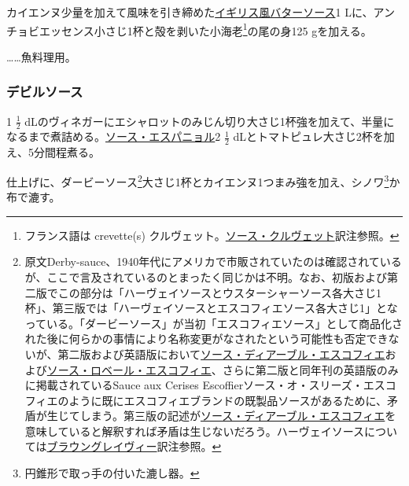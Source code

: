 \begin{recette}
カイエンヌ少量を加えて風味を引き締めた\protect\hyperlink{butter-sauce}{イギリス風バターソース}1
Lに、アンチョビエッセンス小さじ1杯と殻を剥いた小海老\footnote{フランス語は
  crevette(s)
  クルヴェット。\protect\hyperlink{sauce-aux-crevettes}{ソース・クルヴェット}訳注参照。}の尾の身125
gを加える。

\ldots{}\ldots{}魚料理用。

\hypertarget{devilled-sauce}{%
\subsubsection{デビルソース}\label{devilled-sauce}}



1 \(\frac{1}{2}\)
dLのヴィネガーにエシャロットのみじん切り大さじ1杯強を加えて、半量になるまで煮詰める。\protect\hyperlink{sauce-espagnole}{ソース・エスパニョル}2
\(\frac{1}{2}\) dLとトマトピュレ大さじ2杯を加え、5分間程煮る。

仕上げに、ダービーソース\footnote{原文Derby-sauce、1940年代にアメリカで市販されていたのは確認されているが、ここで言及されているのとまったく同じかは不明。なお、初版および第二版でこの部分は「ハーヴェイソースとウスターシャーソース各大さじ1杯」、第三版では「ハーヴェイソースとエスコフィエソース各大さじ1」となっている。「ダービーソース」が当初「エスコフィエソース」として商品化された後に何らかの事情により名称変更がなされたという可能性も否定できないが、第二版および英語版において\protect\hyperlink{sauce-diable-escoffier}{ソース・ディアーブル・エスコフィエ}および\protect\hyperlink{sauce-robert-escoffier}{ソース・ロベール・エスコフィエ}、さらに第二版と同年刊の英語版のみに掲載されているSauce
  aux Cerises
  Escoffierソース・オ・スリーズ・エスコフィエのように既にエスコフィエブランドの既製品ソースがあるために、矛盾が生じてしまう。第三版の記述が\protect\hyperlink{sauce-diable-escoffier}{ソース・ディアーブル・エスコフィエ}を意味していると解釈すれば矛盾は生じないだろう。ハーヴェイソースについては\protect\hyperlink{brown-gravy}{ブラウングレイヴィー}訳注参照。}大さじ1杯とカイエンヌ1つまみ強を加え、シノワ\footnote{円錐形で取っ手の付いた漉し器。}か布で漉す。


\end{recette}
